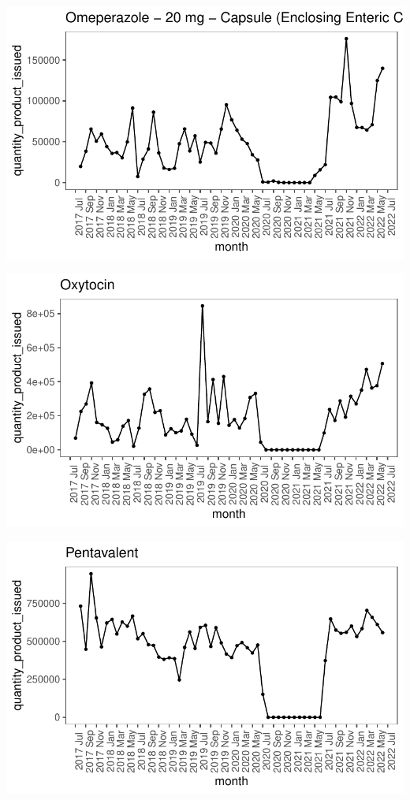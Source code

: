 \documentclass[
  authoryear,
  preprint,
  3p]{elsarticle}
\begin{document}
\includegraphics{main_files/figure-pdf/unnamed-chunk-22-1.pdf}

\includegraphics{main_files/figure-pdf/unnamed-chunk-23-1.pdf}

\includegraphics{main_files/figure-pdf/unnamed-chunk-24-1.pdf}
\end{document}
